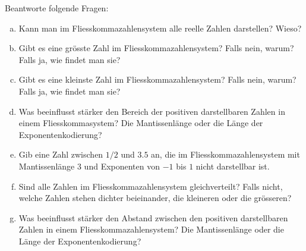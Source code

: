 \begin{aufgabe}\label{fliesskommazahlen_kontrollfragen}
Beantworte folgende Fragen:
\begin{enumerate}[(a)]
\item Kann man im Fliesskommazahlensystem alle reelle Zahlen darstellen? Wieso?
\item Gibt es eine grösste Zahl im Fliesskommazahlensystem? Falls nein, warum? Falls ja, wie findet man sie?
\item Gibt es eine kleinste Zahl im Fliesskommazahlensystem? Falls nein, warum? Falls ja, wie findet man sie?
\item Was beeinflusst stärker den Bereich der positiven darstellbaren Zahlen in einem Fliesskommasystem? Die Mantissenlänge oder die Länge der Exponentenkodierung?
\item Gib eine Zahl zwischen \(1/2\) und \(3.5\) an, die im Fliesskommazahlensystem mit Mantissenlänge \(3\) und Exponenten von \(-1\) bis \(1\) nicht darstellbar ist.
\item Sind alle Zahlen im Fliesskommazahlensystem gleichverteilt? Falls nicht, welche Zahlen stehen dichter beieinander, die kleineren oder die grösseren?
\item Was beeinflusst stärker den Abstand zwischen den positiven darstellbaren Zahlen in einem Fliesskommazahlensystem? Die Mantissenlänge oder die Länge der Exponentenkodierung?
\end{enumerate}
\end{aufgabe}
